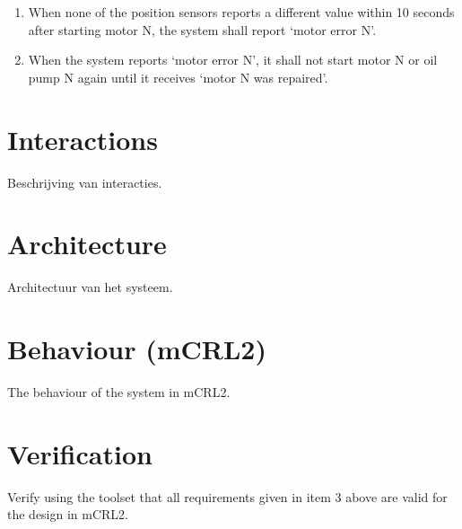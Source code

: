 \documentclass{article}
\begin{document}
\begin{enumerate}
    \item When none of the position sensors reports a different value within 10 seconds 
    after starting motor N, the system shall report {\lq}motor error N{\rq}.
    \item When the system reports {\lq}motor error N{\rq}, it shall not start motor N or oil pump
    N again until it receives {\lq}motor N was repaired{\rq}.
\end{enumerate}

\section{Interactions}
Beschrijving van interacties.

\section{Architecture}
Architectuur van het systeem.

\section{Behaviour (mCRL2)}
The behaviour of the system in mCRL2.

\section{Verification}
Verify using the toolset that all requirements given in item 3 above are valid for the design
in mCRL2.
\end{document}
